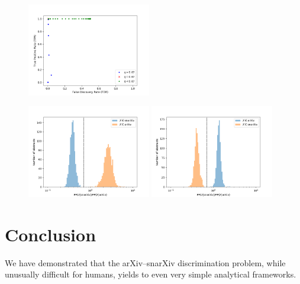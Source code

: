 \documentclass{article}
\begin{document}
\begin{figure}[!htbp]
\centering
	\includegraphics[width=0.48\textwidth]{../figures/FDR_TPR_plot.png}
\end{figure}



\begin{figure}[!htbp]
\centering
	\includegraphics[width=0.48\textwidth]{../figures/BOW_histogram.png}
	\hfill
	\includegraphics[width=0.48\textwidth]{../figures/bigram_histogram.png}
\end{figure}










\section{Conclusion}
We have demonstrated that the arXiv--snarXiv discrimination problem, while unusually difficult for humans, yields to even very simple analytical frameworks. 
\end{document}
